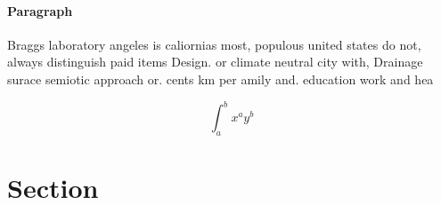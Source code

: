 \documentclass[a4paper]{article}
\begin{document}
\paragraph{Paragraph}
Braggs laboratory angeles is caliornias most, populous united states do not, always distinguish paid items Design. or climate neutral city with, Drainage surace semiotic approach or. cents km per amily and. education work and hea


\[ \int_{a}^{b}{x^{a}y^{b}} \]

\section{Section}
\end{document}

